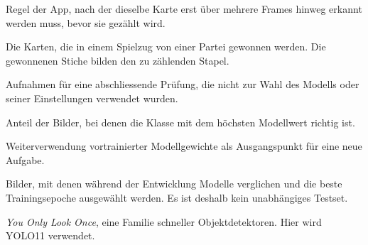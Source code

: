 \begin{description}[style=unboxed, leftmargin=0pt, itemsep=1pt]
  \item[Stabilitätsregel] Regel der App, nach der dieselbe Karte erst über mehrere Frames hinweg erkannt werden muss, bevor sie gezählt wird.

  \item[Stich] Die Karten, die in einem Spielzug von einer Partei gewonnen werden. Die gewonnenen Stiche bilden den zu zählenden Stapel.

  \item[Testset] Aufnahmen für eine abschliessende Prüfung, die nicht zur Wahl des Modells oder seiner Einstellungen verwendet wurden.

  \item[Top-1-Genauigkeit] Anteil der Bilder, bei denen die Klasse mit dem höchsten Modellwert richtig ist.

  \item[Transfer Learning] Weiterverwendung vortrainierter Modellgewichte als Ausgangspunkt für eine neue Aufgabe.

  \item[Validierungsset] Bilder, mit denen während der Entwicklung Modelle verglichen und die beste Trainingsepoche ausgewählt werden. Es ist deshalb kein unabhängiges Testset.

  \item[YOLO] \emph{You Only Look Once}, eine Familie schneller Objektdetektoren. Hier wird YOLO11 verwendet.
\end{description}
\normalsize
